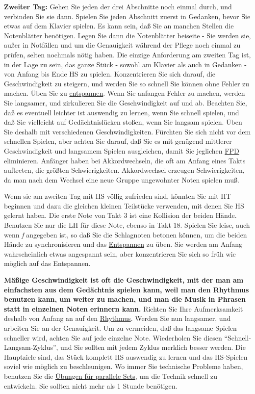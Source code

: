 \textbf{Zweiter Tag:} Gehen Sie jeden der drei Abschnitte noch einmal durch, und verbinden Sie sie dann.
Spielen Sie jeden Abschnitt zuerst in Gedanken, bevor Sie etwas auf dem Klavier spielen.
Es kann sein, daß Sie an manchen Stellen die Notenblätter benötigen.
Legen Sie dann die Notenblätter beiseite - Sie werden sie, außer in Notfällen und um die Genauigkeit während der Pflege noch einmal zu prüfen, selten nochmals nötig haben.
Die einzige Anforderung am zweiten Tag ist, in der Lage zu sein, das ganze Stück - sowohl am Klavier als auch in Gedanken - von Anfang bis Ende HS zu spielen.
Konzentrieren Sie sich darauf, die Geschwindigkeit zu steigern, und werden Sie so schnell Sie können ohne Fehler zu machen.
Üben Sie zu \hyperref[c1ii14]{entspannen}.
Wenn Sie anfangen Fehler zu machen, werden Sie langsamer, und zirkulieren Sie die Geschwindigkeit auf und ab.
Beachten Sie, daß es eventuell leichter ist auswendig zu lernen, wenn Sie schnell spielen, und daß Sie vielleicht auf Gedächtnislücken stoßen, wenn Sie langsam spielen.
Üben Sie deshalb mit verschiedenen Geschwindigkeiten.
Fürchten Sie sich nicht vor dem schnellen Spielen, aber achten Sie darauf, daß Sie es mit genügend mittlerer Geschwindigkeit und langsamem Spielen ausgleichen, damit Sie jeglichen \hyperref[fpd]{FPD} eliminieren.
Anfänger haben bei Akkordwechseln, die oft am Anfang eines Takts auftreten, die größten Schwierigkeiten.
Akkordwechsel erzeugen Schwierigkeiten, da man nach dem Wechsel eine neue Gruppe ungewohnter Noten spielen muß.

Wenn sie am zweiten Tag mit HS völlig zufrieden sind, könnten Sie mit HT beginnen und dazu die gleichen kleinen Teilstücke verwenden, mit denen Sie HS gelernt haben.
Die erste Note von Takt 3 ist eine Kollision der beiden Hände. Benutzen Sie nur die LH für diese Note, ebenso in Takt 18.
Spielen Sie leise, auch wenn \textit{f} angegeben ist, so daß Sie die Schlagnoten betonen können, um die beiden Hände zu synchronisieren und das \hyperref[c1ii14]{Entspannen} zu üben.
Sie werden am Anfang wahrscheinlich etwas angespannt sein, aber konzentrieren Sie sich so früh wie möglich auf das Entspannen.

\textbf{Mäßige Geschwindigkeit ist oft die Geschwindigkeit, mit der man am einfachsten aus dem Gedächtnis spielen kann, weil man den Rhythmus benutzen kann, um weiter zu machen, und man die Musik in Phrasen statt in einzelnen Noten erinnern kann.}
Richten Sie Ihre Aufmerksamkeit deshalb von Anfang an auf den \hyperref[c1iii1b]{Rhythmus}.
Werden Sie nun langsamer, und arbeiten Sie an der Genauigkeit.
Um zu vermeiden, daß das langsame Spielen schneller wird, achten Sie auf jede einzelne Note.
Wiederholen Sie diesen \enquote{Schnell-Langsam-Zyklus}, und Sie sollten mit jedem Zyklus merklich besser werden.
Die Hauptziele sind, das Stück komplett HS auswendig zu lernen und das HS-Spielen soviel wie möglich zu beschleunigen.
Wo immer Sie technische Probleme haben, benutzen Sie die \hyperref[c1iii7b]{Übungen für parallele Sets}, um die Technik schnell zu entwickeln.
Sie sollten nicht mehr als 1 Stunde benötigen.

